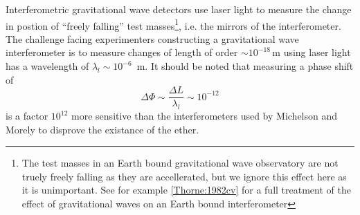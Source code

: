 Interferometric gravitational wave detectors use laser light to measure the
change in postion of ``freely falling'' test masses\footnote{The
test masses in an Earth bound gravitational wave observatory are not truely
freely falling as they are accellerated, but we ignore this effect here as it 
is unimportant. See for example \ref{Thorne:1982cv} for a full treatment of
the effect of gravitational waves on an Earth bound interferometer}, i.e. the
mirrors of the interferometer.  The challenge facing experimenters
constructing a gravitational wave interferometer is to measure changes of
length of order $\sim 10^{-18}\,\mathrm{m}$ using laser light has a wavelength
of $\lambda_l \sim 10^{-6}$~m.  It should be noted that measuring a phase
shift of
\begin{equation}
\Delta \Phi \sim \frac{\Delta L}{\lambda_l} \sim 10^{-12}
\end{equation}
is a factor $10^{12}$ more sensitive than the interferometers used by
Michelson and Morely to disprove the existance of the ether.

